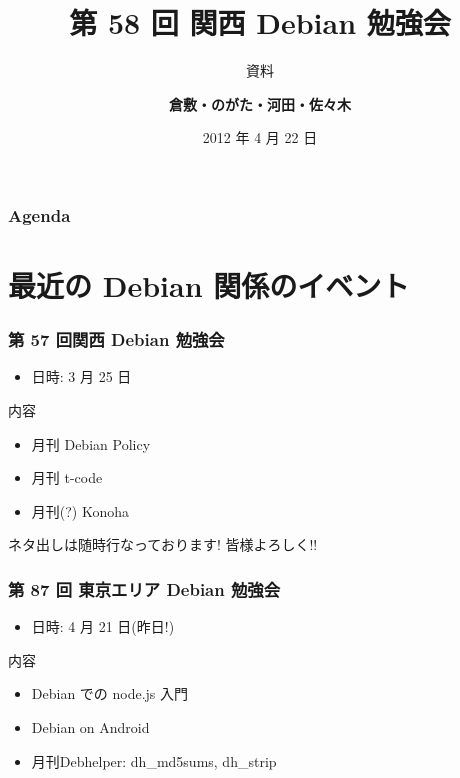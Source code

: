 \documentclass[cjk,dvipdfmx,10pt,%
hyperref={bookmarks=true,bookmarksnumbered=true,bookmarksopen=false,%
colorlinks=false,%
pdftitle={第 58 回 関西 Debian 勉強会},%
pdfauthor={倉敷・のがた・河田・佐々木},%
pdfsubject={資料},%
}]{beamer}
\title{第 58 回 関西 Debian 勉強会}
\subtitle{{\scriptsize 資料}}
\author[佐々木 洋平]{{\large\bf 倉敷・のがた・河田・佐々木}}
\institute[Debian JP]{{\normalsize\tt 関西 Debian 勉強会}}
\date{{\small 2012 年 4 月 22 日}}
\begin{document}
\settitleslide
\begin{frame}
\titlepage
\end{frame}
\setdefaultslide

\begin{frame}[fragile]
\frametitle{Agenda}

\tableofcontents

\end{frame}

\section{最近の Debian 関係のイベント}


\begin{frame}[fragile]
\frametitle{第 57 回関西 Debian 勉強会}

\begin{itemize}
\item 日時: 3 月 25 日
\end{itemize}

\begin{block}{内容}
  \begin{itemize}
  \item 月刊 Debian Policy
  \item 月刊 t-code
  \item 月刊(?) Konoha
  \end{itemize}
\end{block}
ネタ出しは随時行なっております! 皆様よろしく!!
\end{frame}

\begin{frame}[fragile]
  \frametitle{第 87 回 東京エリア Debian 勉強会}
  \begin{itemize}
  \item  日時: 4 月 21 日(昨日!)
  \end{itemize}
  \begin{block}{内容}
    \begin{itemize}
    \item Debian での node.js 入門
    \item Debian on Android
    \item 月刊Debhelper: dh\_md5sums, dh\_strip
    \end{itemize}
  \end{block}
\end{frame}
\end{document}
